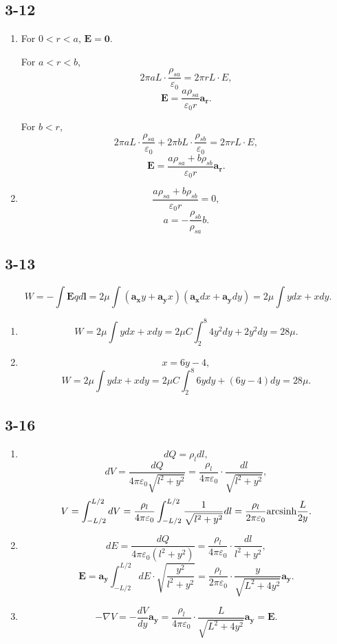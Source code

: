 \documentclass[11pt,a4paper]{article}
\begin{document}
\subsection{3-12}
\begin{enumerate}[label=\alph*)]
\item 
For $0<r<a$, $\mathbf{E}=\mathbf{0}$.

For $a<r<b$, $$2\pi aL\cdot\frac{\rho_{sa}}{\varepsilon_0}=2\pi rL\cdot E,$$
$$\mathbf{E}=\frac{a\rho_{sa}}{\varepsilon_0 r}\mathbf{a_r}.$$

For $b<r$, $$2\pi aL\cdot\frac{\rho_{sa}}{\varepsilon_0}+2\pi bL\cdot\frac{\rho_{sb}}{\varepsilon_0}=2\pi rL\cdot E,$$
$$\mathbf{E}=\frac{a\rho_{sa}+b\rho_{sb}}{\varepsilon_0 r}\mathbf{a_r}.$$
\item
$$\frac{a\rho_{sa}+b\rho_{sb}}{\varepsilon_0 r}=0,$$
$$a=-\frac{\rho_{sb}}{\rho_{sa}}b.$$
\end{enumerate}

\subsection{3-13}
$$W=-\int\mathbf{E}qd\mathbf{l}=2\mu \int(\mathbf{a_x}y+\mathbf{a_y}x)(\mathbf{a_x}dx+\mathbf{a_y}dy)=2\mu \int ydx+xdy.$$
\begin{enumerate}[label=\alph*)]
\item 
$$W=2\mu \int ydx+xdy=2\mu C\int_2^8 4y^2dy+2y^2dy=28\mu.$$
\item 
$$x=6y-4,$$
$$W=2\mu \int ydx+xdy=2\mu C\int_2^8 6ydy+(6y-4)dy=28\mu.$$
\end{enumerate}

\subsection{3-16}
\begin{enumerate}[label=\alph*)]
\item 
$$dQ=\rho_l dl,$$
$$dV=\frac{dQ}{4\pi\varepsilon_0\sqrt{l^2+y^2}}=\frac{\rho_l}{4\pi\varepsilon_0}\cdot\frac{dl}{\sqrt{l^2+y^2}},$$
$$V=\int_{-L/2}^{L/2}dV=\frac{\rho_l}{4\pi\varepsilon_0}\int_{-L/2}^{L/2}\frac{1}{\sqrt{l^2+y^2}} dl=\frac{\rho_l}{2\pi\varepsilon_0}{\rm arcsinh}\frac{L}{2y}.$$
\item
$$dE=\frac{dQ}{4\pi\varepsilon_0(l^2+y^2)}=\frac{\rho_l}{4\pi\varepsilon_0}\cdot\frac{dl}{l^2+y^2},$$
$$\mathbf{E}=\mathbf{a_y}\int_{-L/2}^{L/2}dE\cdot\sqrt{\frac{y^2}{l^2+y^2}}=\frac{\rho_l}{2\pi\varepsilon_0}\cdot\frac{y}{\sqrt{L^2+4y^2}}\mathbf{a_y}.$$
\item
$$-\nabla V=-\frac{dV}{dy}\mathbf{a_y}=\frac{\rho_l}{4\pi\varepsilon_0}\cdot\frac{L}{\sqrt{L^2+4y^2}}\mathbf{a_y}=\mathbf{E}.$$
\end{enumerate}
\end{document}
